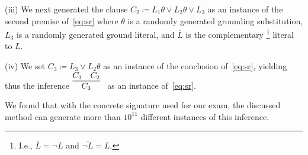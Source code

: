 
\noindent (iii)  We next generated the clause
$C_2 \coloneqq \overline{L_1\theta} \lor L_2\theta \lor L_3$
as an instance of the second premise of~\eqref{eq:sr}
where $\theta$ is a randomly generated grounding substitution,
$L_3$ is a randomly generated ground literal,
and
$\overline{L}$ is the complementary%
\footnote{I.e., $\overline{L} = \lnot L$ and $\overline{\lnot L} = L$.}
literal to $L$.\smallskip

\noindent (iv)
We set $C_3 \coloneqq L_3 \lor L_2\theta$ as an instance of the
conclusion of~\eqref{eq:sr}, yielding thus the inference $\infer[]{
      C_3
      }{
      C_1
      &
      {C_2}}$ as an instance of~\eqref{eq:sr}.\smallskip

 




We found that with the concrete signature used for our exam,
the discussed method can generate more than $10^{11}$ different instances
of this inference.
